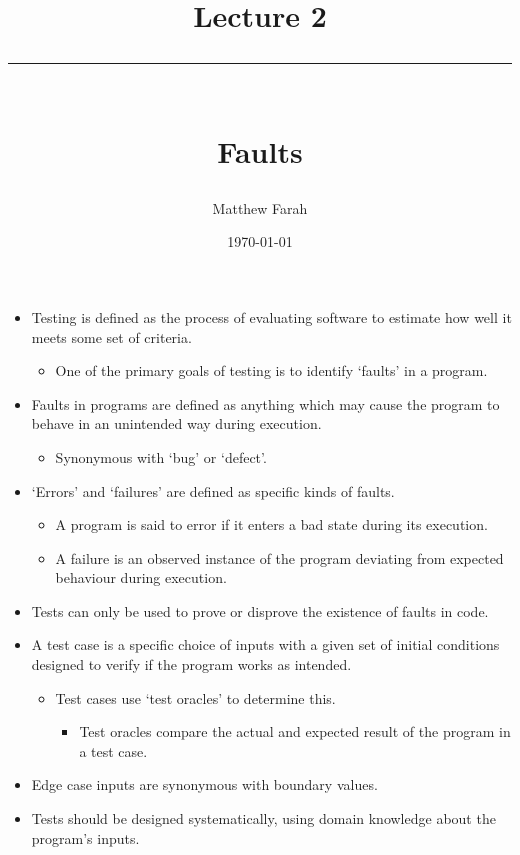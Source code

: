 \documentclass{article}
\date{
	\vspace{-.75em}
	{\large \today}
}
\title{
	\vspace*{-1.5em}
	{\Huge Lecture 2} \\
	\vspace{-1em}
	\rule{\textwidth/4}{.01em} \\
	\vspace{-.25em}
	{\Large Faults}
	\vspace{-.75em}
}
\author{
	{\large Matthew Farah}
}
\begin{document}
\maketitle
\pagestyle{fancy}

\fi

\begin{itemize}
	\item Testing is defined as the process of evaluating software to estimate how well it meets some set of criteria.
	\begin{itemize}
		\item One of the primary goals of testing is to identify `faults' in a program.
	\end{itemize}
	\item Faults in programs are defined as anything which may cause the program to behave in an unintended way during execution.
	\begin{itemize}
		\item Synonymous with `bug' or `defect'.
	\end{itemize}
	\item `Errors' and `failures' are defined as specific kinds of faults.
	\begin{itemize}
		\item A program is said to error if it enters a bad state during its execution.
		\item A failure is an observed instance of the program deviating from expected behaviour during execution.
	\end{itemize}
	\item Tests can only be used to prove or disprove the existence of faults in code.
	\item A test case is a specific choice of inputs with a given set of initial conditions designed to verify if the program works as intended.
	\begin{itemize}
		\item Test cases use `test oracles' to determine this.
		\begin{itemize}
			\item Test oracles compare the actual and expected result of the program in a test case.
		\end{itemize}
	\end{itemize}
	\item Edge case inputs are synonymous with boundary values.
	\item Tests should be designed systematically, using domain knowledge about the program's inputs.
\end{itemize}

\ifdefined\iscombined
	\newpage
\else
	
\end{document}
